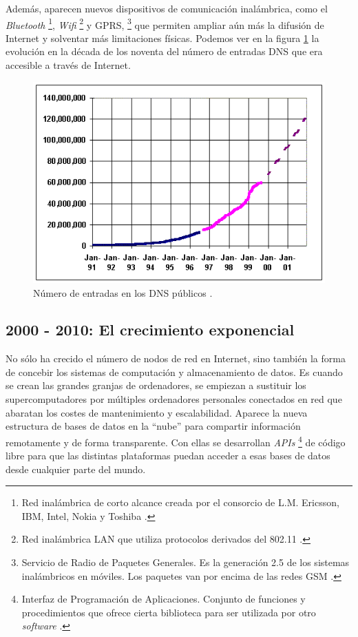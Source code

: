Además, aparecen nuevos dispositivos de comunicación inalámbrica, como el 
\emph{Bluetooth} \footnote{Red inalámbrica de corto alcance creada por 
el consorcio de L.M. Ericsson, IBM, Intel, Nokia y Toshiba 
\cite{Tanenbaum}.}, \emph{Wifi} \footnote{Red inalámbrica LAN que 
utiliza protocolos derivados del 802.11 \cite{Tanenbaum}.} y GPRS, 
\footnote{Servicio de Radio de Paquetes Generales. Es la generación 
2.5 de los sistemas inalámbricos en móviles. Los paquetes van por 
encima de las redes GSM \cite{Tanenbaum}.} que permiten ampliar aún 
más la difusión de Internet y solventar más limitaciones físicas. 
Podemos ver en la figura \ref{fig:internet-growth} la evolución en la 
década de los noventa del número de entradas DNS que era accesible a 
través de Internet.

\begin{figure}[h]
	\centering
	\includegraphics[scale=0.68]{images/internet-growth.png}
	\caption[Entradas en los DNS]{Número de entradas en los DNS públicos \cite{CloudComputing}.}
	\label{fig:internet-growth}
\end{figure}

\subsection{2000 - 2010: El crecimiento exponencial}
No sólo ha crecido el número de nodos de red en Internet, sino 
también la forma de concebir los sistemas de computación y 
almacenamiento de datos. Es cuando se crean las grandes granjas de 
ordenadores, se empiezan a sustituir los supercomputadores por 
múltiples ordenadores personales conectados en red que abaratan los 
costes de mantenimiento y escalabilidad. Aparece la nueva estructura 
de bases de datos en la ``nube'' para compartir información 
remotamente y de forma transparente. Con ellas se desarrollan 
\emph{APIs} \footnote{Interfaz de Programación de Aplicaciones. 
Conjunto de funciones y procedimientos que ofrece cierta biblioteca 
para ser utilizada por otro \emph{software} \cite{Tanenbaum}.} de código 
libre para que las distintas plataformas puedan acceder a esas bases de 
datos desde cualquier parte del mundo.

